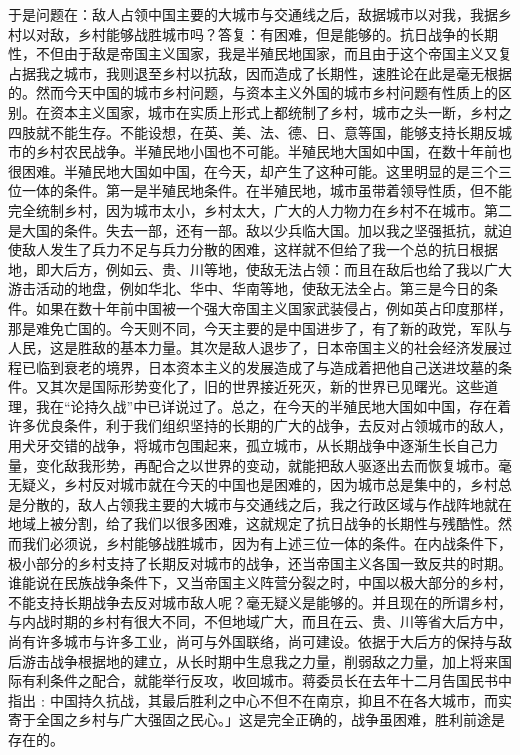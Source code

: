 于是问题在：敌人占领中国主要的大城市与交通线之后，敌据城市以对我，我据乡村以对敌，乡村能够战胜城市吗？答复：有困难，但是能够的。抗日战争的长期性，不但由于敌是帝国主义国家，我是半殖民地国家，而且由于这个帝国主义又复占据我之城市，我则退至乡村以抗敌，因而造成了长期性，速胜论在此是毫无根据的。然而今天中国的城市乡村问题，与资本主义外国的城市乡村问题有性质上的区别。在资本主义国家，城市在实质上形式上都统制了乡村，城市之头一断，乡村之四肢就不能生存。不能设想，在英、美、法、德、日、意等国，能够支持长期反城市的乡村农民战争。半殖民地小国也不可能。半殖民地大国如中国，在数十年前也很困难。半殖民地大国如中国，在今天，却产生了这种可能。这里明显的是三个三位一体的条件。第一是半殖民地条件。在半殖民地，城市虽带着领导性质，但不能完全统制乡村，因为城市太小，乡村太大，广大的人力物力在乡村不在城市。第二是大国的条件。失去一部，还有一部。敌以少兵临大国。加以我之坚强抵抗，就迫使敌人发生了兵力不足与兵力分散的困难，这样就不但给了我一个总的抗日根据地，即大后方，例如云、贵、川等地，使敌无法占领：而且在敌后也给了我以广大游击活动的地盘，例如华北、华中、华南等地，使敌无法全占。第三是今日的条件。如果在数十年前中国被一个强大帝国主义国家武装侵占，例如英占印度那样，那是难免亡国的。今天则不同，今天主要的是中国进步了，有了新的政党，军队与人民，这是胜敌的基本力量。其次是敌人退步了，日本帝国主义的社会经济发展过程已临到衰老的境界，日本资本主义的发展造成了与造成着把他自己送进坟墓的条件。又其次是国际形势变化了，旧的世界接近死灭，新的世界已见曙光。这些道理，我在“论持久战”中已详说过了。总之，在今天的半殖民地大国如中国，存在着许多优良条件，利于我们组织坚持的长期的广大的战争，去反对占领城市的敌人，用犬牙交错的战争，将城市包围起来，孤立城市，从长期战争中逐渐生长自己力量，变化敌我形势，再配合之以世界的变动，就能把敌人驱逐出去而恢复城市。毫无疑义，乡村反对城市就在今天的中国也是困难的，因为城市总是集中的，乡村总是分散的，敌人占领我主要的大城市与交通线之后，我之行政区域与作战阵地就在地域上被分割，给了我们以很多困难，这就规定了抗日战争的长期性与残酷性。然而我们必须说，乡村能够战胜城市，因为有上述三位一体的条件。在内战条件下，极小部分的乡村支持了长期反对城市的战争，还当帝国主义各国一致反共的时期。谁能说在民族战争条件下，又当帝国主义阵营分裂之时，中国以极大部分的乡村，不能支持长期战争去反对城市敌人呢？毫无疑义是能够的。并且现在的所谓乡村，与内战时期的乡村有很大不同，不但地域广大，而且在云、贵、川等省大后方中，尚有许多城市与许多工业，尚可与外国联络，尚可建设。依据于大后方的保持与敌后游击战争根据地的建立，从长时期中生息我之力量，削弱敌之力量，加上将来国际有利条件之配合，就能举行反攻，收回城市。蒋委员长在去年十二月告国民书中指出﹕中国持久抗战，其最后胜利之中心不但不在南京，抑且不在各大城市，而实寄于全国之乡村与广大强固之民心。」这是完全正确的，战争虽困难，胜利前途是存在的。


